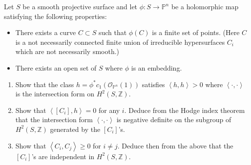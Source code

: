 \documentclass{book}
\begin{document}
\begin{exercise}
\label{exercise-curve-surfa-hodge-index}
\begin{reference}
\cite[Exercise 2, Chapter 11]{voi}
\end{reference}
Let $S$ be a smooth projective surface and
let $\phi:S \to \mathbb{P}^n$
be a holomorphic map satisfying the following
properties:
\begin{itemize}
\item There exists a curve $C \subset S$
such that $\phi(C)$ is a finite set of
points.
(Here $C$ is a not necessarily connected
finite union
of irreducible hypersurfaces $C_i$ which are
not necessarily smooth.)

\item There exists an open set of $S$ where
$\phi$ is an embedding.
\end{itemize}
\begin{enumerate}
\item Show that the class
$h=\phi^*c_1(\mathcal{O}_{\mathbb{P}^n}(1))$
satisfies $\left\langle{}h,h\right\rangle{} >0$ where
$\left\langle{}\cdot,\cdot\right\rangle{}$ is the
intersection form on $H^2(S,\mathbb{Z})$.

\item Show that $\left\langle{}[C_i],h\right\rangle{}=0$ for
any $i$.
Deduce from the Hodge index theorem that the
intersection form
$\left\langle{}\cdot,\cdot\right\rangle{}$ is negative
definite on the subgroup
of $H^2(S,\mathbb{Z})$ generated by the
$[C_i]$'s.

\item Show that $\left\langle{}C_i,C_j\right\rangle{}\geq 0$
for $i\neq j$.
Deduce then from the above that the $[C_i]$'s
are independent in $H^2(S,\mathbb{Z})$.
\end{enumerate}
\end{exercise}
\end{document}
